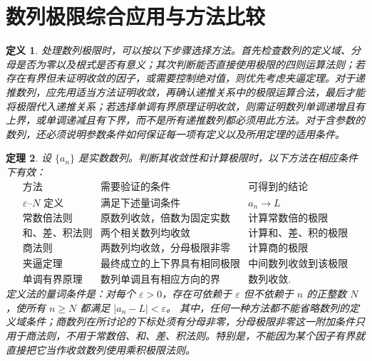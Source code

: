 \documentclass[UTF8,fontset=fandol,11pt]{ctexart}
\newtheorem{definition}{定义}[section]
\newtheorem{theorem}[definition]{定理}
\begin{document}
\section{数列极限综合应用与方法比较}\label{sec:S05}
\begin{definition}
\label{def:limit-proof-strategy}处理数列极限时，可以按以下步骤选择方法。首先检查数列的定义域、分母是否为零以及根式是否有意义；其次判断能否直接使用极限的四则运算法则；若存在有界但未证明收敛的因子，或需要控制绝对值，则优先考虑夹逼定理。对于递推数列，应先用适当方法证明收敛，再确认递推关系中的极限运算合法，最后才能将极限代入递推关系；若选择单调有界原理证明收敛，则需证明数列单调递增且有上界，或单调递减且有下界，而不是所有递推数列都必须用此方法。对于含参数的数列，还必须说明参数条件如何保证每一项有定义以及所用定理的适用条件。
\end{definition}
\begin{theorem}
\label{thm:convergence-method-selection}设 $\{a_n\}$ 是实数数列。判断其收敛性和计算极限时，以下方法在相应条件下有效：
\[
\begin{array}{c|c|c}
\text{方法}&\text{需要验证的条件}&\text{可得到的结论}\\ \hline
\text{$\varepsilon$--$N$ 定义}&\text{满足下述量词条件}&a_n\to L\\
\text{常数倍法则}&\text{原数列收敛，倍数为固定实数}&\text{计算常数倍的极限}\\
\text{和、差、积法则}&\text{两个相关数列均收敛}&\text{计算和、差、积的极限}\\
\text{商法则}&\text{两数列均收敛，分母极限非零}&\text{计算商的极限}\\
\text{夹逼定理}&\text{最终成立的上下界具有相同极限}&\text{中间数列收敛到该极限}\\
\text{单调有界原理}&\text{数列单调且有相应方向的界}&\text{数列收敛}.
\end{array}
\]
定义法的量词条件是：对每个 $\varepsilon>0$，存在可依赖于 $\varepsilon$ 但不依赖于 $n$ 的正整数 $N$，使所有 $n\geq N$ 都满足 $|a_n-L|<\varepsilon$。
其中，任何一种方法都不能省略数列的定义域条件；商数列在所讨论的下标处须有分母非零，分母极限非零这一附加条件只用于商法则，不用于常数倍、和、差、积法则。特别是，不能因为某个因子有界就直接把它当作收敛数列使用乘积极限法则。
\end{theorem}
\end{document}
